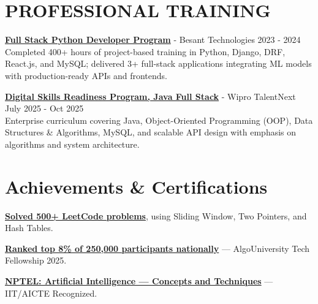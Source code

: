 \documentclass[11pt,a4paper]{article}
\begin{document}
\section*{PROFESSIONAL TRAINING}
\href{https://drive.google.com/file/d/1CS81JFPO8L9vSmByeIGmTdETCP0P4K7V/view?usp=sharing}{\textbf{Full Stack Python Developer Program}} - Besant Technologies \hfill 2023 - 2024 \\
Completed 400+ hours of project-based training in Python, Django, DRF, React.js, and MySQL; delivered 3+ full-stack applications integrating ML models with production-ready APIs and frontends.

\vspace{2pt}

\href{https://drive.google.com/file/d/1ZVFwlRAh3_I4M5uSibgwYRN9qZ2K-_9M/view?usp=sharing}{\textbf{Digital Skills Readiness Program, Java Full Stack}} - Wipro TalentNext  \hfill July 2025 - Oct 2025 \\
Enterprise curriculum covering Java, Object-Oriented Programming (OOP), Data Structures \& Algorithms, MySQL, and scalable API design with emphasis on algorithms and system architecture.

\section*{Achievements \& Certifications}

\href{https://leetcode.com/u/venu08/}{\textbf{Solved 500+ LeetCode problems}}, using Sliding Window, Two Pointers, and Hash Tables.

\href{https://drive.google.com/file/d/18poK4HNb-lAyC-LBmd839reUDWUlzvY9/view?usp=sharing}{\textbf{Ranked top 8\% of 250,000 participants nationally}} --- AlgoUniversity Tech Fellowship 2025. 

\href{https://drive.google.com/file/d/1iVlwlmWTUJSEL2aEI23mYyU4gIWdFW0Z/view?usp=sharing}{\textbf{NPTEL: Artificial Intelligence --- Concepts and Techniques}} --- IIT/AICTE Recognized. 
\end{document}
